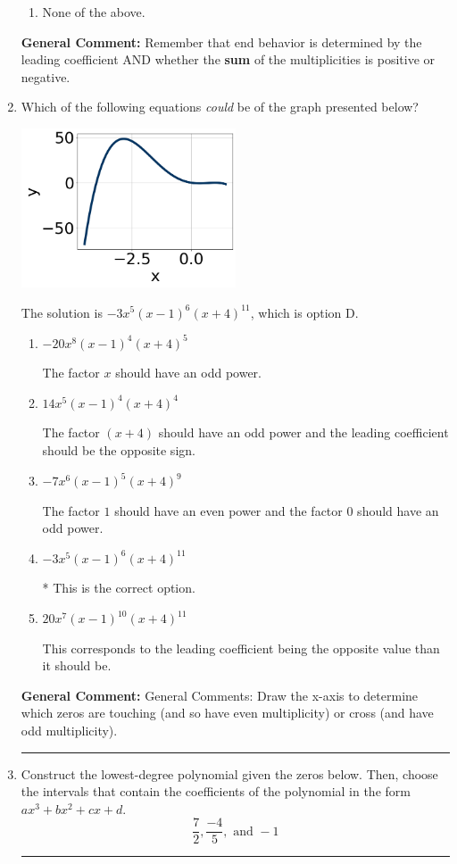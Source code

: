 \documentclass{extbook}[14pt]
\newcommand{\litem}[1]{\item #1

\rule{\textwidth}{0.4pt}}
\begin{document}
\begin{enumerate}
{\begin{enumerate}[label=\Alph*.]
\begin{multicols}{2}
\end{multicols}\item None of the above.\end{enumerate}
\textbf{General Comment:} Remember that end behavior is determined by the leading coefficient AND whether the \textbf{sum} of the multiplicities is positive or negative.
}
\litem{
Which of the following equations \textit{could} be of the graph presented below?

\begin{center}
    \includegraphics[width=0.5\textwidth]{../Figures/polyGraphToFunctionCopyB.png}
\end{center}




The solution is \( -3x^{5} (x - 1)^{6} (x + 4)^{11} \), which is option D.\begin{enumerate}[label=\Alph*.]
\item \( -20x^{8} (x - 1)^{4} (x + 4)^{5} \)

The factor $x$ should have an odd power.
\item \( 14x^{5} (x - 1)^{4} (x + 4)^{4} \)

The factor $(x + 4)$ should have an odd power and the leading coefficient should be the opposite sign.
\item \( -7x^{6} (x - 1)^{5} (x + 4)^{9} \)

The factor $1$ should have an even power and the factor $0$ should have an odd power.
\item \( -3x^{5} (x - 1)^{6} (x + 4)^{11} \)

* This is the correct option.
\item \( 20x^{7} (x - 1)^{10} (x + 4)^{11} \)

This corresponds to the leading coefficient being the opposite value than it should be.
\end{enumerate}

\textbf{General Comment:} General Comments: Draw the x-axis to determine which zeros are touching (and so have even multiplicity) or cross (and have odd multiplicity).
}
\litem{
Construct the lowest-degree polynomial given the zeros below. Then, choose the intervals that contain the coefficients of the polynomial in the form $ax^3+bx^2+cx+d$.
\[ \frac{7}{2}, \frac{-4}{5}, \text{ and } -1 \]

}
\end{enumerate}
\end{document}
